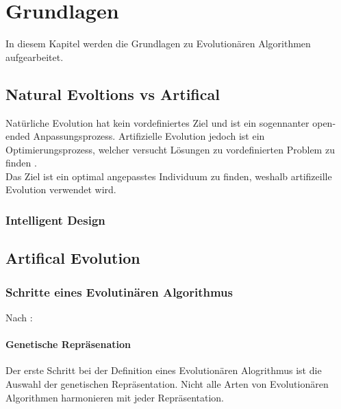 %
%


\chapter{Grundlagen}

In diesem Kapitel werden die Grundlagen zu Evolutionären Algorithmen aufgearbeitet.

\section{Natural Evoltions vs Artifical}

  Natürliche Evolution hat kein vordefiniertes Ziel und ist ein sogennanter open-ended Anpassungsprozess.
  Artifizielle Evolution jedoch ist ein Optimierungsprozess,
  welcher versucht Lösungen zu vordefinierten Problem zu finden \cite[S.1]{book:bioInspired}.
  \\
  Das Ziel ist ein optimal angepasstes Individuum zu finden, weshalb artifizeille Evolution verwendet wird.

  \subsection{Intelligent Design}
  \label{sub:IntelligentDesign}


\section{Artifical Evolution}

  \subsection{Schritte eines Evolutinären Algorithmus}
  \label{sub:stepsEvAlgo}
    Nach \cite[S.16 - 29]{book:bioInspired}: \\

    \subsubsection{Genetische Repräsenation}
    Der erste Schritt bei der Definition eines Evolutionären Alogrithmus ist die Auswahl der genetischen Repräsentation.
    Nicht alle Arten von Evolutionären Algorithmen harmonieren mit jeder Repräsentation.

